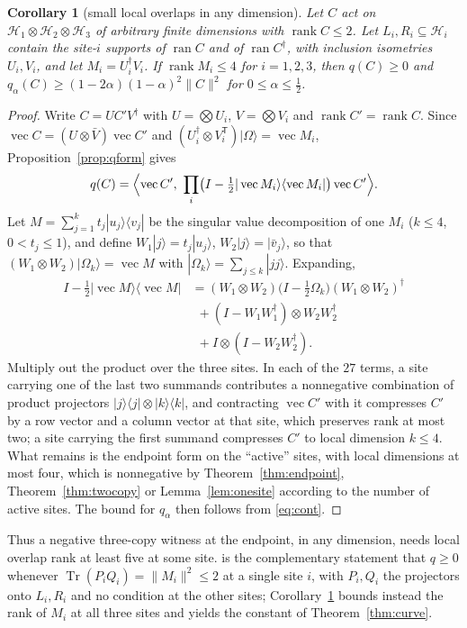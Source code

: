 \documentclass[aps,pra,twocolumn,superscriptaddress,nofootinbib,longbibliography]{revtex4-2}
\newcommand{\Hh}{\mathcal H}
\newcommand{\ket}[1]{|#1\rangle}
\newcommand{\bra}[1]{\langle #1|}
\newcommand{\Om}{\Omega}
\DeclareMathOperator{\Tr}{Tr}
\DeclareMathOperator{\ran}{ran}
\DeclareMathOperator{\rank}{rank}
\DeclareMathOperator{\vecop}{vec}
\newcommand{\T}{\mathsf T}
\theoremstyle{plain}
\newtheorem{corollary}[theorem]{Corollary}
\theoremstyle{definition}
\theoremstyle{remark}
\begin{document}
\begin{corollary}[small local overlaps in any dimension]\label{cor:overlap}
Let $C$ act on $\Hh_1\otimes\Hh_2\otimes\Hh_3$ of arbitrary finite dimensions with $\rank C\le2$. Let $L_i,R_i\subseteq\Hh_i$ contain the site-$i$ supports of\/ $\ran C$ and of\/ $\ran C^\dagger$, with inclusion isometries $U_i,V_i$, and let $M_i=U_i^\dagger V_i$. If $\rank M_i\le4$ for $i=1,2,3$, then $q(C)\ge0$ and $q_\alpha(C)\ge(1-2\alpha)(1-\alpha)^2\|C\|^2$ for $0\le\alpha\le\tfrac12$.
\end{corollary}
\begin{proof}
Write $C=UC'V^\dagger$ with $U=\bigotimes U_i$, $V=\bigotimes V_i$ and $\rank C'=\rank C$. Since $\vecop C=(U\otimes\bar V)\vecop C'$ and $(U_i^\dagger\otimes V_i^{\T})\ket\Om=\vecop M_i$, Proposition~\ref{prop:qform} gives
\[
q(C)=\Bigl\langle\vecop C',\ \prod_i\bigl(I-\tfrac12\ket{\vecop M_i}\bra{\vecop M_i}\bigr)\vecop C'\Bigr\rangle .
\]
Let $M=\sum_{j=1}^kt_j\ket{u_j}\bra{v_j}$ be the singular value decomposition of one $M_i$ ($k\le4$, $0<t_j\le1$), and define $W_1\ket j=t_j\ket{u_j}$, $W_2\ket j=\ket{\bar v_j}$, so that $(W_1\otimes W_2)\ket{\Om_k}=\vecop M$ with $\ket{\Om_k}=\sum_{j\le k}\ket{jj}$. Expanding,
\begin{align*}
I-\tfrac12\ket{\vecop M}\bra{\vecop M}&=(W_1\!\otimes\! W_2)\bigl(I-\tfrac12\Om_k\bigr)(W_1\!\otimes\! W_2)^\dagger\\
&\ \ +(I-W_1W_1^\dagger)\otimes W_2W_2^\dagger\\
&\ \ +I\otimes(I-W_2W_2^\dagger).
\end{align*}
Multiply out the product over the three sites. In each of the $27$ terms, a site carrying one of the last two summands contributes a nonnegative combination of product projectors $\ket j\bra j\otimes\ket k\bra k$, and contracting $\vecop C'$ with it compresses $C'$ by a row vector and a column vector at that site, which preserves rank at most two; a site carrying the first summand compresses $C'$ to local dimension $k\le4$. What remains is the endpoint form on the ``active'' sites, with local dimensions at most four, which is nonnegative by Theorem~\ref{thm:endpoint}, Theorem~\ref{thm:twocopy} or Lemma~\ref{lem:onesite} according to the number of active sites. The bound for $q_\alpha$ then follows from \eqref{eq:cont}.
\end{proof}

Thus a negative three-copy witness at the endpoint, in any dimension, needs local overlap rank at least five at some site. \cite[Theorem~7.2]{WuZou} is the complementary statement that $q\ge0$ whenever $\Tr(P_iQ_i)=\|M_i\|^2\le2$ at a single site $i$, with $P_i,Q_i$ the projectors onto $L_i,R_i$ and no condition at the other sites; Corollary~\ref{cor:overlap} bounds instead the rank of $M_i$ at all three sites and yields the constant of Theorem~\ref{thm:curve}.
\end{document}
